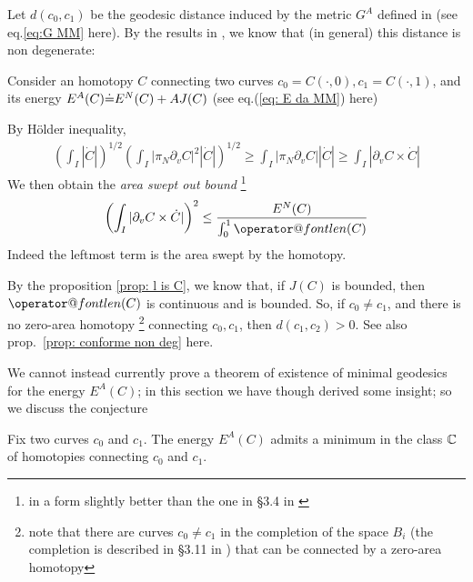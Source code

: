 \documentclass[twoside,a4paper,english]{article}
\makeatletter
\def\derpar#1{\partial_{#1}}
\def\len{\mathop{\operator@font len}\nolimits}
\makeatother
\begin{document}
Let $d(c_0,c_1)$  be the geodesic distance induced by 
the metric  $G^A$  defined in \cite{Michor-Mumford}
(see eq.\eqref{eq:G MM} here).
By the results in  \cite{Michor-Mumford}, we know that (in 
general) this distance is non degenerate:
\begin{Proposition}\label{rem: d>0 in MM}
  Consider an homotopy $C$ connecting two curves 
  $c_0=C(\cdot,0),c_1=C(\cdot,1)$,
  and its energy $E^A(C){\stackrel{\mbox{.}}{=}} E^N(C)+AJ(C)$
  (see eq.(\ref{eq: E da MM}) here)

  By H\"older inequality,
  \begin{eqnarray*}
    \left(\int_I |\dot C|\right)^{1/2}
    \left(\int_I |\pi_N\derpar v C|^2|\dot C|\right)^{1/2}\ge
    \int_I |\pi_N\derpar v C| |\dot C|\ge
    \int_I |\derpar v C\times \dot C|
  \end{eqnarray*}
  We then obtain the
  \emph{area swept out bound} 
  \footnote{in a form slightly better than the one 
    in \S3.4 in \cite{Michor-Mumford}}
  \[ \left(\int_I |\derpar v C\times \dot C| \right)^{2}
  \le \frac{E^N(C)}{\int_0^1\len(C)} \]
  Indeed the leftmost term is the area swept by the
  homotopy.


  By the proposition \ref{prop: l is C}, we know that, if $J(C)$ is
  bounded, then  $\len(C)$ is continuous and is bounded.
  So, if $c_0\neq c_1$, and there is no zero-area homotopy
  \footnote{note that there are  curves $c_0\neq c_1$
    in the completion of the
    space $B_i$ (the completion is described in \S3.11 in
    \cite{Michor-Mumford}) that can be connected by a   zero-area
    homotopy}
  connecting $c_0,c_1$, then $d(c_1,c_2)>0$. 
  See also prop.~\ref{prop: conforme non deg} here.
\end{Proposition}

We cannot instead currently prove a theorem of existence of
minimal geodesics for the energy $E^A(C)$;
in this section we have though derived some insight;
so we discuss the conjecture 

\begin{Conjecture}%
  \label{conj:MM}
  Fix two curves $c_0$ and $c_1$.
  The energy $E^A(C)$ admits a minimum in the class $\mathbb C$ of
  homotopies connecting $c_0$ and $c_1$.
\end{Conjecture}
\end{document}
